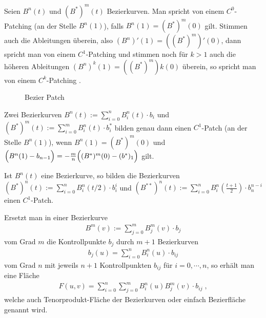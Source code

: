 \begin{Definition}[Patching]
Seien $B^n(t)$ und $(B^*)^m(t)$  Bezierkurven. Man spricht von einem $C^0$-Patching (an der Stelle $B^n(1)$), falls
 $B^n(1) = (B^*)^m(0) $ gilt. Stimmen auch die Ableitungen überein, also  $(B^n)'(1) = ((B^*)^m)'(0) $, dann spricht man von einem $C^1$-Patching und stimmen noch für $k> 1$ auch
die höheren Ableitungen $(B^n)^{k}(1) = ((B^*)^m){k}(0) $ überein, so spricht man von einem $C^k$-Patching . 
 \end{Definition}


\begin{figure}[H]
    \centering
    
    \caption{Bezier Patch}
    \label{fig:bezier-patch}
\end{figure}

\begin{Bemerkung}
Zwei Bezierkurven   $B^n(t) := \sum_{i = 0}^{n} B_i^n(t) \cdot  b_i$ und $(B^*)^m(t) := \sum_{i = 0}^{m} B_i^n(t) \cdot  b^*_i$ bilden genau dann einen $C^1$-Patch  (an der Stelle $B^n(1)$), wenn 
$B^n(1) = (B^*)^m(0)$ und $\Bigl(B^n(1) - b_{n-1} \Bigr)= - \frac{m}{n}  \Bigl((B^*)^m(0) - (b^*)_1 \Bigr)$ gilt.
\end{Bemerkung}


\begin{Definition}
Ist  $B^n(t)$ eine Bezierkurve, so bilden die Bezierkurven $(B^{*})^n(t)  :=  \sum_{i = 0}^{n} B_i^n(t/2) \cdot  b_i^i$ und  $(B^{**})^n(t)  :=  \sum_{i = 0}^{n} B_i^n( \frac{t+1} {2}) \cdot  b_n^{n-i}$
einen $C^1$-Patch.
\end{Definition}


\begin{Definition}
Ersetzt man in einer Bezierkurve 
\begin{align*}
B^m(v) := \sum_{j = 0}^{m} B_j^m(v) \cdot  b_j
\end{align*}
vom Grad $m$ die Kontrollpunkte $b_j$ durch $m+1$ Bezierkurven
\begin{align*}
b_j (u)= \sum_{i = 0}^{n} B_i^n(u) \cdot  b_{ij}
\end{align*}
 vom Grad $n$ mit jeweils $n+1$ Kontrollpunkten $ b_{ij}$ für $i = 0, \cdots , n$, so erhält man eine Fläche
\begin{align*}
F(u,v) =  \sum_{i = 0}^{n}  \sum_{j = 0}^{m} B_i^n(u) B_j^m(v) \cdot  b_{ij} \; ,
\end{align*}
welche auch Tenorprodukt-Fläche der Bezierkurven  oder einfach Bezierfläche genannt wird.
\end{Definition}


